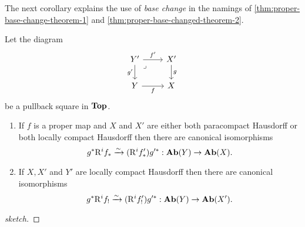 The next corollary explains the use of \emph{base change} in the namings of \cref{thm:proper-base-change-theorem-1} and \cref{thm:proper-base-changed-theorem-2}. 

\begin{cor}\label{cor:proper-base-change}
Let the diagram 
\[\begin{tikzcd}
	{Y'} & {X'} \\
	Y & X
	\arrow["{f'}", from=1-1, to=1-2]
	\arrow["{g'}"', from=1-1, to=2-1]
	\arrow["\lrcorner"{anchor=center, pos=0.125}, draw=none, from=1-1, to=2-2]
	\arrow["g", from=1-2, to=2-2]
	\arrow["f"', from=2-1, to=2-2]
\end{tikzcd}\]
be a pullback square in $\mathbf{Top}$. 
\begin{enumerate}[label=(\roman*)]
	\item If $f$ is a proper map and $X$ and $X'$ are either both paracompact Hausdorff or both locally compact Hausdorff then there are canonical isomorphisms \[
    	g^* \mathrm{R}^i f_* \xrightarrow{\sim} (\mathrm{R}^i f'_*)g'^{*}: \operatorname{\mathbf{Ab}}(Y) \to \operatorname{\mathbf{Ab}}(X).
    \]
	\item If $X,X'$ and $Y'$ are locally compact Hausdorff then there are canonical isomorphisms \[
    	g^*\mathrm{R}^i f_! \xrightarrow{\sim} (\mathrm{R}^i f'_!)g'^{*}: \operatorname{\mathbf{Ab}}(Y) \to \operatorname{\mathbf{Ab}}(X').
    \]
\end{enumerate}
\end{cor}
\begin{proof}[sketch]
\end{proof}
